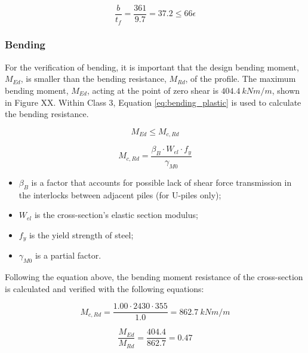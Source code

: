 \begin{equation}
    \frac{b}{t_{f}} = \frac{361}{9.7} = 37.2 \leq 66 \epsilon 
    \label{eq:class}
\end{equation}

\subsubsection{Bending}

For the verification of bending, it is important that the design bending moment, $M_{Ed}$, is smaller than the bending resistance, $M_{Rd}$, of the profile. The maximum bending moment, $M_{Ed}$, acting at the point of zero shear is $404.4 \ kNm/m$, shown in Figure XX. Within Class 3, Equation \ref{eq:bending_plastic} is used to calculate the bending resistance.

\begin{equation}
    M_{Ed} \leq M_{c,Rd}
\end{equation}

\begin{equation}
    M_{c,Rd} = \frac{\beta_{B} \cdot W_{el} \cdot f_{y}}{\gamma_{M0}}
    \label{eq:bending_plastic}
\end{equation}

\begin{itemize}
  \item $\beta_B$ is a factor that accounts for possible lack of shear force transmission in the interlocks between adjacent piles (for U-piles only);
  \item $W_{el}$ is the cross-section’s elastic section modulus;
  \item $f_y$ is the yield strength of steel;
  \item $\gamma_{M0}$ is a partial factor.
\end{itemize}

Following the equation above, the bending moment resistance of the cross-section is calculated and verified with the following equations:

\begin{equation}
    M_{c,Rd} = \frac{1.00 \cdot 2430 \cdot 355}{1.0} = 862.7 \ kNm/m
\end{equation}

\begin{equation}
    \frac{M_{Ed}}{M_{Rd}} = \frac{404.4}{862.7} = 0.47
\end{equation}


